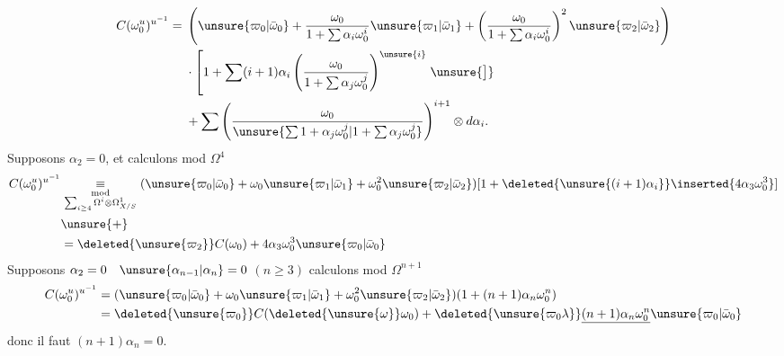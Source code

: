 \[
\begin{aligned}
C(\omega_0^u)^{u^{-1}}={}&\left(\unsure{\varpi_0|\bar\omega_0}+\frac{\omega_0}{1+\sum\alpha_i\omega_0^i}\unsure{\varpi_1|\bar\omega_1}+\left(\frac{\omega_0}{1+\sum\alpha_i\omega_0^i}\right)^2\unsure{\varpi_2|\bar\omega_2}\right)\\
&\cdot\left[1+\sum(i+1)\alpha_i\left(\frac{\omega_0}{1+\sum\alpha_j\omega_0^j}\right)^{\unsure{i}}\right.\unsure{\big]}\\
&+\sum\left(\frac{\omega_0}{\unsure{\sum1+\alpha_j\omega_0^j|1+\sum\alpha_j\omega_0^j}}\right)^{i+1}\otimes d\alpha_i.
\end{aligned}
\]
Supposons $\alpha_2=0$, et calculons mod $\Omega^4$
\[
\begin{aligned}
C(\omega_0^u)^{u^{-1}}
&\underset{\substack{\mathrm{mod}\\\sum_{i\geq4}\Omega^i\otimes\Omega^1_{X/S}}}{\equiv}
(\unsure{\varpi_0|\bar\omega_0}+\omega_0\unsure{\varpi_1|\bar\omega_1}+\omega_0^2\unsure{\varpi_2|\bar\omega_2})
[1+\deleted{\unsure{(i+1)\alpha_i}}\inserted{4\alpha_3\omega_0^3}]\\
&\unsure{+}\\
&=\deleted{\unsure{\varpi_2}}C(\omega_0)+4\alpha_3\omega_0^3\unsure{\varpi_0|\bar\omega_0}
\end{aligned}
\]
Supposons $\alpha_2=0\quad\unsure{\alpha_{n-1}|\alpha_n}=0$ $(n\geq3)$ calculons mod $\Omega^{n+1}$
\[
\begin{aligned}
C(\omega_0^u)^{u^{-1}}&=(\unsure{\varpi_0|\bar\omega_0}+\omega_0\unsure{\varpi_1|\bar\omega_1}+\omega_0^2\unsure{\varpi_2|\bar\omega_2})(1+(n+1)\alpha_n\omega_0^n)\\
&=\deleted{\unsure{\varpi_0}}C(\deleted{\unsure{\omega}}\omega_0)+\deleted{\unsure{\varpi_0\lambda}}\underline{(n+1)\alpha_n\omega_0^n}\unsure{\varpi_0|\bar\omega_0}
\end{aligned}
\]
donc il faut $(n+1)\alpha_n=0$.


